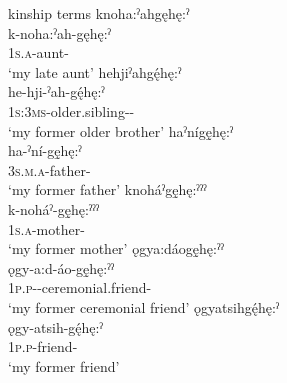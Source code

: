 \ea\label{ex:gehex3} kinship terms
\ea knoha:ˀahgęhę:ˀ\\
\gll k-noha:ˀah-gęhę:ˀ\\
 \textsc{1s.a}-aunt-{\past}\\
\glt `my late aunt'
\ex hehjiˀahgę́hę:ˀ\\
\gll he-hji-ˀah-gę́hę:ˀ\\
 \textsc{1s:3ms}-older.sibling-{\diminutive-\past}\\
\glt `my former older brother'
\ex haˀnígę̱hę:ˀ\\
\gll ha-ˀní-gę̱hę:ˀ\\ 
 \textsc{3s.m.a}-father-{\past}\\
\glt `my former father'
\ex knoháˀgę̱hę:ˀˀˀ\\
\gll k-noháˀ-gę̱hę:ˀˀˀ\\
 \textsc{1s.a}-mother-{\past}\\
\glt `my former mother'
\newpage
{}
\ex ǫgya:dáogę̱hę:ˀˀ\\
\gll ǫgy-a:d-áo-gę̱hę:ˀˀ\\
 \textsc{1p.p}-{\semireflexive}-ceremonial.friend-{\past}\\
\glt `my former ceremonial friend'
\ex ǫgyatsihgę́hę:ˀ\\
\gll ǫgy-atsih-gę́hę:ˀ\\
 \textsc{1p.p}-friend-{\past}\\
\glt `my former friend'
\z
\z

